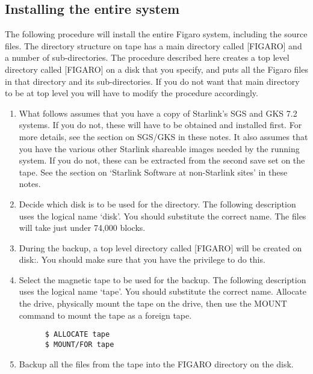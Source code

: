 \subsection{Installing the entire system}

The following procedure will install the entire Figaro system, including the
source files. The directory structure on tape has a main directory called
[FIGARO] and a number of  sub-directories. The procedure described here creates
a top level directory called [FIGARO] on a disk that you specify, and puts all
the Figaro files in that directory and its sub-directories. If you do not want
that main directory to be at top level you will have to modify the procedure
accordingly.

\begin{enumerate}

\item What follows assumes that you have a copy of  Starlink's  SGS and  GKS
7.2  systems.  If you do not, these will have to be obtained and installed
first. For  more  details,  see  the section  on SGS/GKS in these notes.  It
also assumes that you have the various other Starlink shareable  images  needed
by the  running  system. If you do not, these can be extracted from the second
save set on the tape. See  the  section  on `Starlink Software at non-Starlink
sites' in these notes.

\item Decide which disk is to  be  used  for  the  directory. The following
description  uses  the  logical  name `disk'.  You should substitute the
correct name.  The files will take just under 74,000 blocks.

\item During the backup, a top level directory called [FIGARO] will be  created
on disk:.  You should make sure that you have the privilege to do this.

\item Select the magnetic tape to be  used  for  the  backup. The following
description  uses  the  logical  name `tape'.  You should substitute the
correct  name. Allocate  the  drive, physically  mount  the  tape on the drive,
then use the MOUNT command to mount the tape as a foreign tape.

\begin{verbatim}
      $ ALLOCATE tape
      $ MOUNT/FOR tape
\end{verbatim}

\item Backup all the files from the tape into the FIGARO  directory on the
disk.


\end{enumerate}
